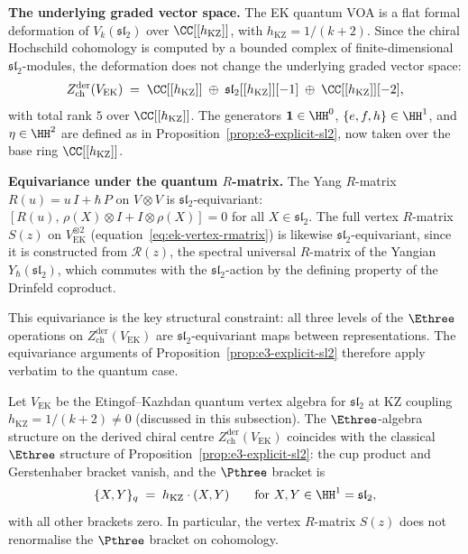 \medskip
\noindent
\textbf{The underlying graded vector space.}
The EK quantum VOA is a flat formal deformation of
$V_k(\mathfrak{sl}_2)$ over $\CC[[h_{\mathrm{KZ}}]]$, with
$h_{\mathrm{KZ}} = 1/(k+2)$.
Since the chiral Hochschild cohomology is computed by
a bounded complex of finite-dimensional
$\mathfrak{sl}_2$-modules, the deformation does not
change the underlying graded vector space:
\begin{equation}\label{eq:ek-e3-graded}
 Z^{\mathrm{der}}_{\mathrm{ch}}(V_{\mathrm{EK}})
 \;=\;
 \CC[[h_{\mathrm{KZ}}]]
 \;\oplus\;
 \mathfrak{sl}_2[[h_{\mathrm{KZ}}]][-1]
 \;\oplus\;
 \CC[[h_{\mathrm{KZ}}]][-2],
\end{equation}
with total rank $5$ over $\CC[[h_{\mathrm{KZ}}]]$.
The generators
$\mathbf{1} \in \HH^0$, $\{e, f, h\} \in \HH^1$, and
$\eta \in \HH^2$ are defined as in
Proposition~\ref{prop:e3-explicit-sl2}, now taken
over the base ring $\CC[[h_{\mathrm{KZ}}]]$.

\medskip
\noindent
\textbf{Equivariance under the quantum $R$-matrix.}
The Yang $R$-matrix $R(u) = u\,I + \hbar\,P$ on
$V \otimes V$ is $\mathfrak{sl}_2$-equivariant:
$[R(u),\, \rho(X) \otimes I + I \otimes \rho(X)] = 0$
for all $X \in \mathfrak{sl}_2$.
The full vertex $R$-matrix
$S(z)$ on $V_{\mathrm{EK}}^{\otimes 2}$
(equation~\eqref{eq:ek-vertex-rmatrix}) is likewise
$\mathfrak{sl}_2$-equivariant, since it is constructed from
$\mathcal{R}(z)$, the spectral universal $R$-matrix of
the Yangian $Y_\hbar(\mathfrak{sl}_2)$, which
commutes with the $\mathfrak{sl}_2$-action by the
defining property of the Drinfeld coproduct.

This equivariance is the key structural constraint: all
three levels of the $\Ethree$ operations on
$Z^{\mathrm{der}}_{\mathrm{ch}}(V_{\mathrm{EK}})$ are
$\mathfrak{sl}_2$-equivariant maps between representations.
The equivariance arguments of
Proposition~\ref{prop:e3-explicit-sl2} therefore apply
verbatim to the quantum case.

\begin{proposition}
\label{prop:e3-ek-quantum}
\ClaimStatusConditional
Let $V_{\mathrm{EK}}$ be the Etingof--Kazhdan quantum
vertex algebra for $\mathfrak{sl}_2$ at KZ coupling
$h_{\mathrm{KZ}} = 1/(k+2) \neq 0$
\textup{(}discussed in this subsection\textup{)}.
The $\Ethree$-algebra structure on the derived chiral
centre $Z^{\mathrm{der}}_{\mathrm{ch}}(V_{\mathrm{EK}})$
coincides with the classical $\Ethree$ structure of
Proposition~\textup{\ref{prop:e3-explicit-sl2}}: the
cup product and Gerstenhaber bracket vanish, and the
$\Pthree$ bracket is
\begin{equation}\label{eq:ek-p3-bracket}
 \{X, Y\}_q \;=\; h_{\mathrm{KZ}} \cdot (X, Y)
 \qquad
 \textup{for } X, Y \in \HH^1 = \mathfrak{sl}_2,
\end{equation}
with all other brackets zero. In particular, the
vertex $R$-matrix $S(z)$ does not renormalise the
$\Pthree$ bracket on cohomology.
\end{proposition}


